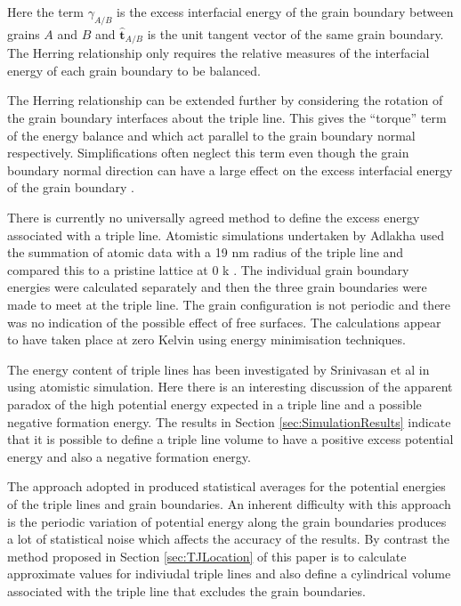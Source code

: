 \documentclass[12pt,a4paper]{book}
\begin{document}
Here the term $\gamma_{A/B}$ is the excess interfacial energy of the grain boundary between grains $A$ and $B$ and $\mathbf{\hat{t}}_{A/B}$ is the unit tangent vector of the same grain boundary. The Herring relationship only requires the relative measures of the interfacial energy of each grain boundary to be balanced.

The Herring relationship can be extended further by considering the rotation of the grain boundary interfaces about the triple line. This gives the ``torque'' term of the energy balance and which act parallel to the grain boundary normal respectively. Simplifications often neglect this term even though the grain boundary normal direction can have a large effect on the excess interfacial energy of the grain boundary \cite{Rowenhurst}.

There is currently no universally agreed method to define the excess energy associated with a triple line. Atomistic simulations undertaken by Adlakha used the summation of atomic data with a 19 nm radius of the triple line and compared this to a pristine lattice at 0 k \cite{Adlakha2015}. The individual grain boundary energies were calculated separately and then the three grain boundaries were made to meet at the triple line. The grain configuration is not periodic and there was no indication of the possible effect of free surfaces. The calculations appear to have taken place at zero Kelvin using energy minimisation techniques. 

The energy content of triple lines has been investigated by Srinivasan et al in \cite{Srinivasan1999} using atomistic simulation. Here there is an interesting discussion of the apparent paradox of the high potential energy expected in a triple line and a possible negative formation energy. The results in Section \ref{sec:SimulationResults} indicate that it is possible to define a triple line volume to have a positive excess potential energy and also a negative formation energy. 

The approach adopted in \cite{Srinivasan1999}   
produced statistical averages for the potential energies of the triple lines and grain boundaries. An inherent difficulty with this approach is the periodic variation of potential energy along the grain boundaries produces a lot of statistical noise which affects the accuracy of the results. By contrast the method proposed in Section \ref{sec:TJLocation} of this paper is to calculate approximate values for indiviudal triple lines and also define a cylindrical volume associated with the triple line that excludes the grain boundaries.
\end{document}
